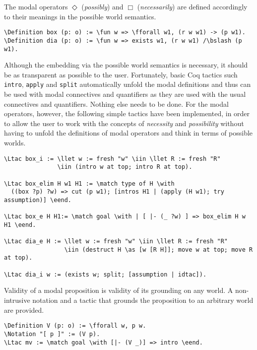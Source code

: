 \documentclass{llncs}
\newcommand{\red}[1]{\textcolor[rgb]{1,0,0}{#1}}
\newcommand{\blue}[1]{\textcolor[rgb]{0,0,1}{#1}}
\newcommand{\Ltac}{\red{Ltac}}
\newcommand{\Definition}{\red{Definition}}
\newcommand{\Notation}{\blue{Notation}}
\newcommand{\llet}{\blue{let}}
\newcommand{\match}{\blue{match}}
\newcommand{\with}{\blue{with}}
\newcommand{\eend}{\blue{end}}
\newcommand{\iin}{\blue{in}}
\newcommand{\as}{\blue{as}}
\newcommand{\fforall}{\blue{forall}}
\newcommand{\fun}{\blue{fun}}
\newcommand{\bslash}{\symbol{92}}
\begin{document}
\noindent
The modal operators $\Diamond$ (\emph{possibly}) and $\Box$ (\emph{necessarily}) are defined accordingly to their meanings in the possible world semantics.

\begin{Verbatim}[commandchars=\\\{\},fontsize=\verbsize]
\Definition box (p: o) := \fun w => \fforall w1, (r w w1) -> (p w1).
\Definition dia (p: o) := \fun w => exists w1, (r w w1) /\bslash (p w1).
\end{Verbatim}

\noindent
Although the embedding via the possible world semantics is necessary, it should be as transparent as possible to the user. Fortunately, basic Coq tactics such \texttt{intro}, \texttt{apply} and \texttt{split} automatically unfold the modal definitions and thus can be used with modal connectives and quantifiers as they are used with the usual connectives and quantifiers. Nothing else needs to be done. For the modal operators, however, the following simple tactics have been implemented, in order to allow the user to work with the concepts of \emph{necessity} and \emph{possibility} without having to unfold the definitions of modal operators and think in terms of possible worlds.

\begin{Verbatim}[commandchars=\\\{\},fontsize=\verbsize]
\Ltac box_i := \llet w := fresh "w" \iin \llet R := fresh "R" 
               \iin (intro w at top; intro R at top).

\Ltac box_elim H w1 H1 := \match type of H \with 
  ((box ?p) ?w) => cut (p w1); [intros H1 | (apply (H w1); try assumption)] \eend.

\Ltac box_e H H1:= \match goal \with | [ |- (_ ?w) ] => box_elim H w H1 \eend.

\Ltac dia_e H := \llet w := fresh "w" \iin \llet R := fresh "R" 
                 \iin (destruct H \as [w [R H]]; move w at top; move R at top).

\Ltac dia_i w := (exists w; split; [assumption | idtac]).
\end{Verbatim}

\noindent
Validity of a modal proposition is validity of its grounding on any world. A non-intrusive notation and a tactic that grounds the proposition to an arbitrary world are provided.

\begin{Verbatim}[commandchars=\\\{\},fontsize=\verbsize]
\Definition V (p: o) := \fforall w, p w.
\Notation "[ p ]" := (V p).
\Ltac mv := \match goal \with [|- (V _)] => intro \eend.
\end{Verbatim}
\end{document}
